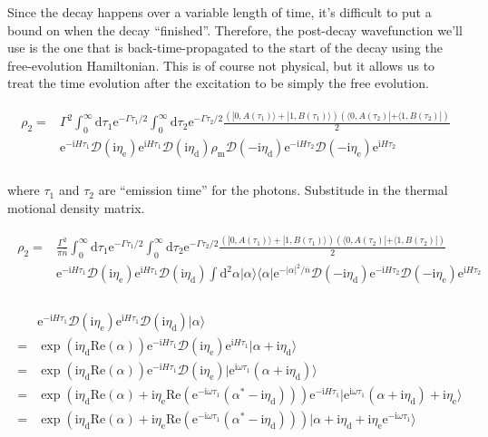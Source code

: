 \documentclass[10pt,fleqn]{article}
\newcommand{\ud}{\mathrm{d}}
\newcommand{\ue}{\mathrm{e}}
\newcommand{\ui}{\mathrm{i}}
\newcommand{\eqar}[1]
{
  \begin{align}
    #1
  \end{align}
}
\newcommand{\paren}[1]{{\left({#1}\right)}}
\newcommand{\abs}[1]{{\left|{#1}\right|}}
\begin{document}
Since the decay happens over a variable length of time,
it's difficult to put a bound on when the decay ``finished''.
Therefore, the post-decay wavefunction we'll use is the one that is
back-time-propagated to the start of the decay using the free-evolution Hamiltonian.
This is of course not physical, but it allows us to treat the time evolution
after the excitation to be simply the free evolution.
\eqar{
  \begin{split}
    \rho_2=&\Gamma^2\int_0^\infty\ud\tau_1\ue^{-\Gamma\tau_1/2}\int_0^\infty\ud\tau_2\ue^{-\Gamma\tau_2/2}\frac{\paren{|0,A(\tau_1)\rangle+|1,B(\tau_1)\rangle}\paren{\langle 0,A(\tau_2)|+\langle 1,B(\tau_2)|}}{2}\\
           &\ue^{-\ui H\tau_1}\mathcal{D}(\ui\eta_{\mathrm{e}})\ue^{\ui H\tau_1}\mathcal{D}(\ui\eta_{\mathrm{d}})\rho_{\mathrm{m}}\mathcal{D}(-\ui\eta_{\mathrm{d}})
             \ue^{-\ui H\tau_2}\mathcal{D}(-\ui\eta_{\mathrm{e}})\ue^{\ui H\tau_2}\\
  \end{split}
}
where $\tau_1$ and $\tau_2$ are ``emission time'' for the photons.
Substitude in the thermal motional density matrix.
\eqar{
  \begin{split}
    \rho_2=&\frac{\Gamma^2}{\pi {\bar n}}\int_0^\infty\ud\tau_1\ue^{-\Gamma\tau_1/2}\int_0^\infty\ud\tau_2\ue^{-\Gamma\tau_2/2}\frac{\paren{|0,A(\tau_1)\rangle+|1,B(\tau_1)\rangle}\paren{\langle 0,A(\tau_2)|+\langle 1,B(\tau_2)|}}{2}\\
           &\ue^{-\ui H\tau_1}\mathcal{D}(\ui\eta_{\mathrm{e}})\ue^{\ui H\tau_1}\mathcal{D}(\ui\eta_{\mathrm{d}})\int\ud^2\alpha |\alpha\rangle\langle\alpha|\ue^{-\abs{\alpha}^2/{\bar n}}\mathcal{D}(-\ui\eta_{\mathrm{d}})
             \ue^{-\ui H\tau_2}\mathcal{D}(-\ui\eta_{\mathrm{e}})\ue^{\ui H\tau_2}\\
  \end{split}
}
\eqar{
  \begin{split}
    &\ue^{-\ui H\tau_1}\mathcal{D}(\ui\eta_{\mathrm{e}})\ue^{\ui H\tau_1}\mathcal{D}(\ui\eta_{\mathrm{d}})|\alpha\rangle\\
    =&\exp\paren{\ui\eta_{\mathrm{d}}\mathrm{Re}(\alpha)}
       \ue^{-\ui H\tau_1}\mathcal{D}(\ui\eta_{\mathrm{e}})\ue^{\ui H\tau_1}
       |\alpha+\ui\eta_{\mathrm{d}}\rangle\\
    =&\exp\paren{\ui\eta_{\mathrm{d}}\mathrm{Re}(\alpha)}
       \ue^{-\ui H\tau_1}\mathcal{D}(\ui\eta_{\mathrm{e}})
       |\ue^{\ui\omega\tau_1}(\alpha+\ui\eta_{\mathrm{d}})\rangle\\
    =&\exp\paren{\ui\eta_{\mathrm{d}}\mathrm{Re}(\alpha)+\ui\eta_{\mathrm{e}}\mathrm{Re}(\ue^{-\ui\omega\tau_1}(\alpha^*-\ui\eta_{\mathrm{d}}))}
       \ue^{-\ui H\tau_1}
       |\ue^{\ui\omega\tau_1}(\alpha+\ui\eta_{\mathrm{d}})+\ui\eta_{\mathrm{e}}\rangle\\
    =&\exp\paren{\ui\eta_{\mathrm{d}}\mathrm{Re}(\alpha)+\ui\eta_{\mathrm{e}}\mathrm{Re}(\ue^{-\ui\omega\tau_1}(\alpha^*-\ui\eta_{\mathrm{d}}))}
       |\alpha+\ui\eta_{\mathrm{d}}+\ui\eta_{\mathrm{e}}\ue^{-\ui\omega\tau_1}\rangle\\
  \end{split}
}
\end{document}
